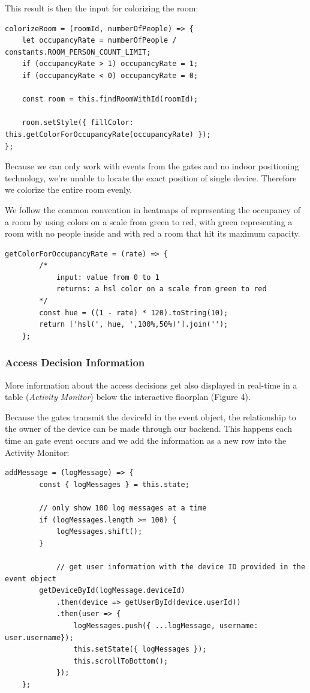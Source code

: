 This result is then the input for colorizing the room:

\begin{lstlisting}[label=colorizeRoom]
colorizeRoom = (roomId, numberOfPeople) => {
    let occupancyRate = numberOfPeople / constants.ROOM_PERSON_COUNT_LIMIT;
    if (occupancyRate > 1) occupancyRate = 1;
    if (occupancyRate < 0) occupancyRate = 0;

    const room = this.findRoomWithId(roomId);

    room.setStyle({ fillColor: this.getColorForOccupancyRate(occupancyRate) });
};
\end{lstlisting}

Because we can only work with events from the gates and no indoor positioning technology, we're unable to locate the exact position of single device. Therefore we colorize the entire room evenly.

We follow the common convention in heatmaps of representing the occupancy of a room by using colors on a scale from green to red, with green representing a room with no people inside and with red a room that hit its maximum capacity. 

\begin{lstlisting}[label=getColorForOccupancyRate]
    getColorForOccupancyRate = (rate) => {
        /*
            input: value from 0 to 1
            returns: a hsl color on a scale from green to red
        */
        const hue = ((1 - rate) * 120).toString(10);
        return ['hsl(', hue, ',100%,50%)'].join('');
    };
\end{lstlisting}

\subsubsection{Access Decision Information}

More information about the access decisions get also displayed in real-time in a table (\emph{Activity Monitor}) below the interactive floorplan (Figure 4).

Because the gates transmit the deviceId in the event object, the relationship to the owner of the device can be made through our backend. This happens each time an gate event occurs and we add the information as a new row into the Activity Monitor:

\begin{lstlisting}[label=addMessage]
addMessage = (logMessage) => {
        const { logMessages } = this.state;
        
        // only show 100 log messages at a time
        if (logMessages.length >= 100) {
            logMessages.shift();
        }

			// get user information with the device ID provided in the event object
        getDeviceById(logMessage.deviceId)
            .then(device => getUserById(device.userId))
            .then(user => {
                logMessages.push({ ...logMessage, username: user.username});
                this.setState({ logMessages });
                this.scrollToBottom();
            });
    };
\end{lstlisting}

